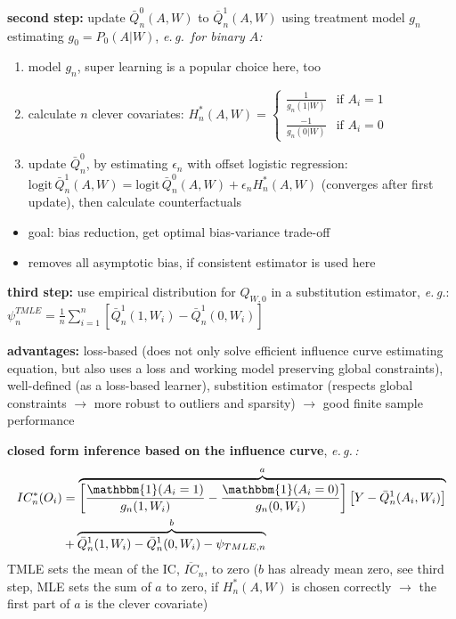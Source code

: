 \documentclass[8pt,twoside]{extarticle}
\begin{document}
\begin{multicols}{2}
\noindent \textbf{second step:} update $\bar{Q}^0_n(A,W)$ to $\bar{Q}^1_n(A,W)$ using treatment model $g_n$ estimating $g_0 = P_0(A|W)$, \textit{e.\,g.\ for binary $A$:} 
\begin{enumerate}[leftmargin=*, itemsep=0em, topsep=0pt, partopsep=0pt,parsep=0pt]
\setlength{\itemsep}{0pt}%
\setlength{\parskip}{0pt}
\item model $g_n$,  super learning is a popular choice here, too
\item calculate $n$ clever covariates: $H^*_n(A,W) {=} \begin{cases}\frac{1}{g_n(1|W)}  &\text{if } A_i{=}1 \\   \frac{{-}1}{g_n(0|W)}        &\text{if } A_i{=}0 \end{cases}$
\item update $\bar{Q}_n^0$, by estimating $\epsilon_n$ with offset logistic regression: $\mathrm{logit} \, \bar{Q}_n^1(A,W) = \mathrm{logit}\, \bar{Q}_n^0(A,W) + \epsilon_n H_n^*(A,W)$ \newline (converges after first update), then calculate counterfactuals
\end{enumerate}
\begin{itemize}[leftmargin=*, itemsep=0em, topsep=0pt, partopsep=0pt,parsep=0pt]
\setlength{\itemsep}{0pt}%
\setlength{\parskip}{0pt}
\item goal: bias reduction, get optimal bias-variance trade-off
\item removes all asymptotic bias, if consistent estimator is used here
\end{itemize}

\noindent \textbf{third step:} use empirical distribution for $Q_{W,0}$ in a substitution estimator, \textit{e.\,g.}: $\psi_n^{TMLE} = \frac{1}{n}\sum_{i=1}^n \left[\bar{Q}^1_n(1,W_i) -  \bar{Q}^1_n(0,W_i)\right] $ 



\noindent \textbf{advantages:} loss-based (does not only solve efficient influence curve estimating equation, but also uses a loss and working model preserving global constraints), well-defined (as a loss-based learner), substition estimator (respects global constraints $\to$ more robust to outliers and sparsity) $\to$ good finite sample performance



\noindent \textbf{closed form inference based on the influence curve}, \textit{e.\,g.\,:}
\begin{align*}IC_n^*(O_i) &= \overbrace{\left[\frac{\mathbbm{1}(A_i=1)}{g_n(1,W_i)} - \frac{\mathbbm{1}(A_i=0)}{g_n(0,W_i)}\right] \left[Y-\bar{Q}^1_n(A_i,W_i)\right]}^{a} \\ 
&+ \overbrace{\bar{Q}^1_n(1,W_i) - \bar{Q}^1_n(0,W_i) -\psi_{TMLE,n}}^{b} 
\end{align*}
TMLE sets the mean of the IC, $\overline{IC}_n$, to zero ($b$ has already mean zero, see third step, MLE sets the sum of $a$ to zero, if $H_n^*(A,W)$ is chosen correctly $\to$ the first part of $a$ is the clever covariate)


\end{multicols}
\end{document}
